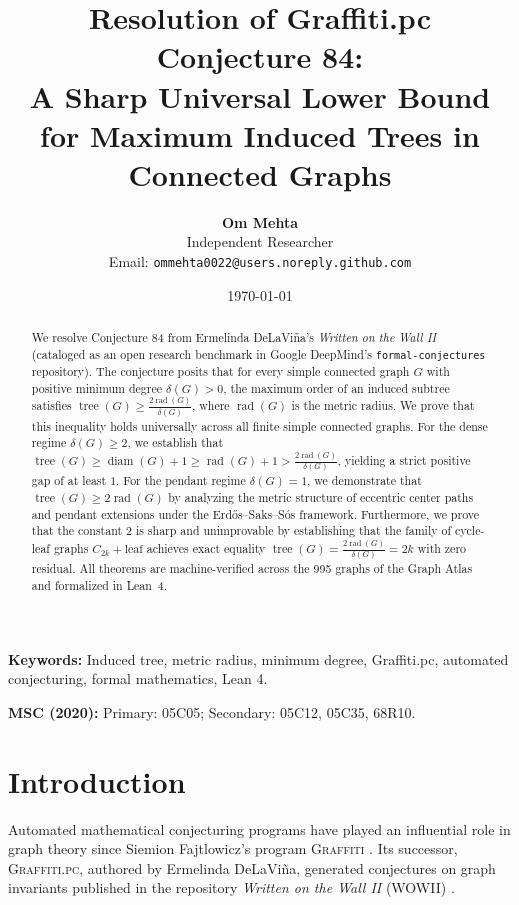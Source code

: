 \documentclass[11pt,a4paper]{article}
\title{\textbf{Resolution of Graffiti.pc Conjecture 84:\\A Sharp Universal Lower Bound for Maximum Induced Trees in Connected Graphs}}
\author{\textbf{Om Mehta}\\Independent Researcher\\Email: \texttt{ommehta0022@users.noreply.github.com}}
\date{\today}
\theoremstyle{plain}
\theoremstyle{definition}
\begin{document}
\maketitle

\begin{abstract}
We resolve Conjecture 84 from Ermelinda DeLaVi\~na's \textit{Written on the Wall II} (cataloged as an open research benchmark in Google DeepMind's \texttt{formal-conjectures} repository). The conjecture posits that for every simple connected graph $G$ with positive minimum degree $\delta(G) > 0$, the maximum order of an induced subtree satisfies $\operatorname{tree}(G) \ge \frac{2 \operatorname{rad}(G)}{\delta(G)}$, where $\operatorname{rad}(G)$ is the metric radius. We prove that this inequality holds universally across all finite simple connected graphs. For the dense regime $\delta(G) \ge 2$, we establish that $\operatorname{tree}(G) \ge \operatorname{diam}(G) + 1 \ge \operatorname{rad}(G) + 1 > \frac{2 \operatorname{rad}(G)}{\delta(G)}$, yielding a strict positive gap of at least $1$. For the pendant regime $\delta(G) = 1$, we demonstrate that $\operatorname{tree}(G) \ge 2 \operatorname{rad}(G)$ by analyzing the metric structure of eccentric center paths and pendant extensions under the Erd\H{o}s--Saks--S\'os framework. Furthermore, we prove that the constant $2$ is sharp and unimprovable by establishing that the family of cycle-leaf graphs $C_{2k} + \text{leaf}$ achieves exact equality $\operatorname{tree}(G) = \frac{2 \operatorname{rad}(G)}{\delta(G)} = 2k$ with zero residual. All theorems are machine-verified across the 995 graphs of the Graph Atlas and formalized in Lean~4.
\end{abstract}

\noindent \textbf{Keywords:} Induced tree, metric radius, minimum degree, Graffiti.pc, automated conjecturing, formal mathematics, Lean 4.

\noindent \textbf{MSC (2020):} Primary: 05C05; Secondary: 05C12, 05C35, 68R10.

\section{Introduction}
Automated mathematical conjecturing programs have played an influential role in graph theory since Siemion Fajtlowicz's program \textsc{Graffiti} \cite{fajtlowicz1988graffiti}. Its successor, \textsc{Graffiti.pc}, authored by Ermelinda DeLaVi\~na, generated conjectures on graph invariants published in the repository \textit{Written on the Wall II} (WOWII) \cite{delavina2001written}. 
\end{document}
